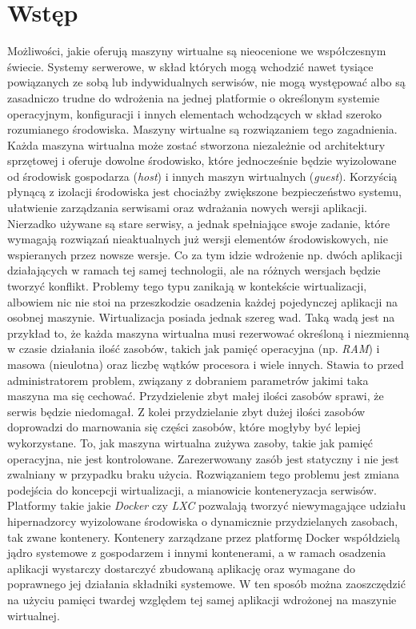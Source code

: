 \documentclass[polish, a4paper, 12pt, oneside]{book}
\begin{document}
	\tableofcontents{}
	
	\chapter{Wstęp}
	Możliwości, jakie oferują maszyny wirtualne są nieocenione we współczesnym świecie. Systemy serwerowe, w skład których mogą wchodzić nawet tysiące powiązanych ze sobą lub indywidualnych serwisów, nie mogą występować albo są zasadniczo trudne do wdrożenia na jednej platformie o określonym systemie operacyjnym, konfiguracji i innych elementach wchodzących w skład szeroko rozumianego środowiska. Maszyny wirtualne są rozwiązaniem tego zagadnienia. Każda maszyna wirtualna może zostać stworzona niezależnie od architektury sprzętowej i oferuje dowolne środowisko, które jednocześnie będzie wyizolowane od środowisk gospodarza (\textit{host}) i innych maszyn wirtualnych (\textit{guest}). Korzyścią płynącą z izolacji środowiska jest chociażby zwiększone bezpieczeństwo systemu, ułatwienie zarządzania serwisami oraz wdrażania nowych wersji aplikacji. Nierzadko używane są stare serwisy, a jednak spełniające swoje zadanie, które wymagają rozwiązań nieaktualnych już wersji elementów środowiskowych, nie wspieranych przez nowsze wersje. Co za tym idzie wdrożenie np. dwóch aplikacji działających w ramach tej samej technologii, ale na różnych wersjach będzie tworzyć konflikt. Problemy tego typu zanikają w kontekście wirtualizacji, albowiem nic nie stoi na przeszkodzie osadzenia każdej pojedynczej aplikacji na osobnej maszynie. Wirtualizacja posiada jednak szereg wad. Taką wadą jest na przykład to, że każda maszyna wirtualna musi rezerwować określoną i niezmienną w czasie działania ilość zasobów, takich jak pamięć operacyjna (np. \textit{RAM}) i masowa (nieulotna) oraz liczbę wątków procesora i wiele innych. Stawia to przed administratorem problem, związany z dobraniem parametrów jakimi taka maszyna ma się cechować. Przydzielenie zbyt małej ilości zasobów sprawi, że serwis będzie niedomagał. Z kolei przydzielanie zbyt dużej ilości zasobów doprowadzi do marnowania się części zasobów, które mogłyby być lepiej wykorzystane. To, jak maszyna wirtualna zużywa zasoby, takie jak pamięć operacyjna, nie jest kontrolowane. Zarezerwowany zasób jest statyczny i nie jest zwalniany w przypadku braku użycia. Rozwiązaniem tego problemu jest zmiana podejścia do koncepcji wirtualizacji, a mianowicie konteneryzacja serwisów. Platformy takie jakie \textit{Docker}\cite{docker} czy \textit{LXC}\cite{lxc} pozwalają tworzyć niewymagające udziału hipernadzorcy wyizolowane środowiska o dynamicznie przydzielanych zasobach, tak zwane kontenery. Kontenery zarządzane przez platformę Docker współdzielą jądro systemowe z gospodarzem i innymi kontenerami, a w ramach osadzenia aplikacji wystarczy dostarczyć zbudowaną aplikację oraz wymagane do poprawnego jej działania składniki systemowe. W ten sposób można zaoszczędzić na użyciu pamięci twardej względem tej samej aplikacji wdrożonej na maszynie wirtualnej. 
	
\end{document}
